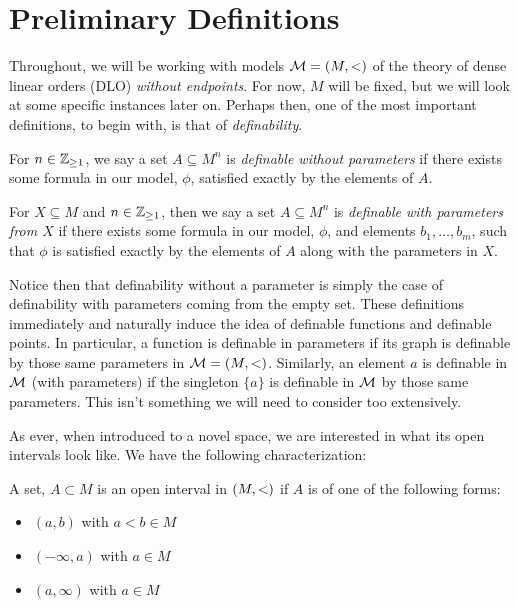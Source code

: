 \section{Preliminary Definitions}
\label{sec:prelim-defns}
Throughout, we will be working with models $ \mathcal{M} = (M, <)$ of the theory of dense linear orders (DLO) \emph{without endpoints}. For now, $M$ will be fixed, but we will look at some specific instances later on. Perhaps then, one of the most important definitions, to begin with, is that of \emph{definability}.

\begin{definition}
For $n \in \mathbb{Z}_{\geq 1}$, we say a set $A \subseteq M^n$ is \emph{definable without parameters} if there exists some formula in our model, $ \phi$, satisfied exactly by the elements of $A$.
\end{definition}

\begin{definition}
For $X \subseteq M$ and $n \in \mathbb{Z}_{\geq 1}$, then we say a set $A \subseteq M^n$ is \emph{definable with parameters from $X$} if there exists some formula in our model, $ \phi$, and elements $b_1, \hdots, b_m$, such that $ \phi$ is satisfied exactly by the elements of $A$ along with the parameters in $X$.
\end{definition}

Notice then that definability without a parameter is simply the case of definability with parameters coming from the empty set. These definitions immediately and naturally induce the idea of definable functions and definable points. In particular, a function is definable in parameters if its graph is definable by those same parameters in $\mathcal{M} = (M, <)$. Similarly, an element $a$ is definable in $\mathcal{M}$ (with parameters) if the singleton $\{a\}$ is definable in $ \mathcal{M}$ by those same parameters. This isn't something we will need to consider too extensively.

As ever, when introduced to a novel space, we are interested in what its open intervals look like. We have the following characterization:

\begin{definition}
  A set, $A \subset M$ is an open interval in $(M, <)$ if $A$ is of one of the following forms:
  \begin{itemize}
    \item $(a, b)$ with $a < b \in M$
    \item $(- \infty, a)$ with $a \in M$
    \item $(a, \infty)$ with $a \in M$
  \end{itemize}
\end{definition}

